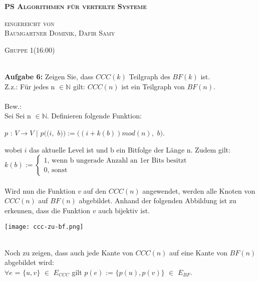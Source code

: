 \documentclass[12pt,a4paper]{report}
\begin{document}
\begin{titlepage}
	\begin{center}
		
		\vspace*{1.0cm}
		\huge
		\textsc{\bf{PS Algorithmen für verteilte Systeme}}
		
		\vspace*{4.0cm}
		\textsc{
			\normalsize{eingereicht von} \\[0.5\baselineskip]
			{\large Baumgartner Dominik, Dafir Samy}
		}
		
		\vspace*{3.0cm}
		\textsc{
			\normalsize{Gruppe  1(16:00)}
		}
		
	\end{center}
	
\end{titlepage}
\ \\
\textbf{Aufgabe 6:}
Zeigen Sie, dass $CCC(k)$ Teilgraph des $BF(k)$ ist.
\\
Z.z.: Für jedes n  $\in \mathbb{N}$ gilt: $CCC(n)$ ist ein Teilgraph von $BF(n)$.\\
\\
Bew.:\\
Sei Sei n  $\in  \mathbb{N}$. Definieren folgende Funktion:
\begin{center}
$p$ : $V \rightarrow V$ $|$ $p((i,$ $b)):=((i + k(b))mod(n),$ $b)$.
\end{center}
wobei $i$ das aktuelle Level ist und b ein Bitfolge der Länge n. Zudem gilt:\\
$k(b) := \begin{cases}\text{1, wenn b ungerade Anzahl an 1er Bits besitzt}\\\text{0, sonst}\end{cases}$
\\
\\
Wird nun die Funktion $v$ auf den $CCC(n)$ angewendet, werden alle Knoten von $CCC(n)$ auf $BF(n)$ abgebildet. Anhand der folgenden Abbildung ist zu erkennen, dass die Funktion $v$ auch bijektiv ist.
\begin{center}
	\texttt{[image: ccc-zu-bf.png]}
\end{center}
\ \\
Noch zu zeigen, dass auch jede Kante von $CCC(n)$ auf eine Kante von $BF(n)$ abgebildet wird:\\
$\forall e$ = $\{u,v\}$  $\in$ $E_{CCC}$ gilt $p(e)$ := $\{p(u),p(v)\}$  $\in$ $E_{BF}$.\\
\newpage
\ \\
\end{document}
